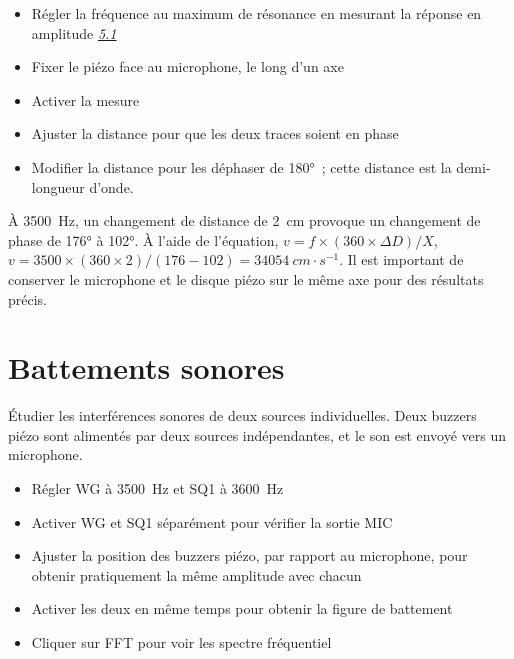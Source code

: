 \documentclass[a4paper,12pt,french]{sphinxmanual}
\let\sphinxpxdimen\pdfpxdimen\else\newdimen\sphinxpxdimen
\begin{document}
\begin{itemize}
\item {} 
Régler la fréquence au maximum de résonance en mesurant la réponse en
amplitude {\hyperref[\detokenize{5.2:sec:Resonance-frequency-of}]{\emph{5.1}}}

\item {} 
Fixer le piézo face au microphone, le long d’un axe

\item {} 
Activer la mesure

\item {} 
Ajuster la distance pour que les deux traces soient en phase

\item {} 
Modifier la distance pour les déphaser de 180° ; cette distance est
la demi-longueur d’onde.

\end{itemize}


À 3500 Hz, un changement de distance de 2 cm provoque un changement de
phase de 176° à 102°. À l’aide de l’équation,
\(v = f \times (360 \times \Delta D)/X\), \(v = 3500 \times (360 \times 2)/(176 - 102) = 34054~cm\cdot s^{-1}\).
Il est important de conserver le microphone et le disque piézo sur le
même axe pour des résultats précis.


\section{Battements sonores}
\label{\detokenize{5.3:battements-sonores}}\label{\detokenize{5.3::doc}}

Étudier les interférences sonores de deux sources individuelles. Deux
buzzers piézo sont alimentés par deux sources indépendantes, et le son
est envoyé vers un microphone.

\noindent\sphinxincludegraphics[width=300\sphinxpxdimen]{{sound-beats}.pdf}

\begin{itemize}
\item {} 
Régler WG à 3500 Hz et SQ1 à 3600 Hz

\item {} 
Activer WG et SQ1 séparément pour vérifier la sortie MIC

\item {} 
Ajuster la position des buzzers piézo, par rapport au microphone,
pour obtenir pratiquement la même amplitude avec chacun

\item {} 
Activer les deux en même temps pour obtenir la figure de battement

\item {} 
Cliquer sur FFT pour voir les spectre fréquentiel

\end{itemize}
\end{document}
